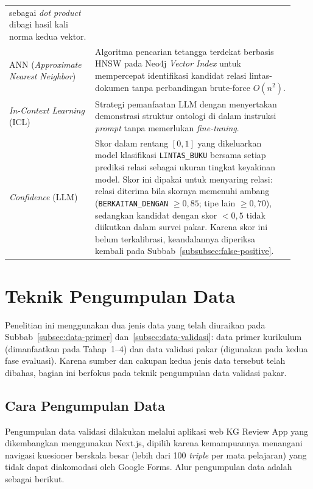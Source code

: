 \documentclass[main]{subfiles}
\begin{document}
\begin{longtable}{@{}p{0.28\linewidth}p{0.65\linewidth}@{}}
      sebagai \textit{dot product} dibagi hasil kali norma kedua vektor.\\
  ANN (\textit{Approximate Nearest Neighbor})
    & Algoritma pencarian tetangga terdekat berbasis HNSW pada Neo4j
      \textit{Vector Index} untuk mempercepat identifikasi kandidat
      relasi lintas-dokumen tanpa perbandingan brute-force
      $O(n^2)$. \\
  \textit{In-Context Learning} (ICL)
    & Strategi pemanfaatan LLM dengan menyertakan demonstrasi struktur
      ontologi di dalam instruksi \textit{prompt} tanpa memerlukan
      \textit{fine-tuning}. \\
  \textit{Confidence} (LLM)
    & Skor dalam rentang $[0,1]$ yang dikeluarkan model klasifikasi
      \texttt{LINTAS\_BUKU} bersama setiap prediksi relasi sebagai ukuran
      tingkat keyakinan model. Skor ini dipakai untuk menyaring relasi:
      relasi diterima bila skornya memenuhi ambang
      (\texttt{BERKAITAN\_DENGAN} $\geq 0{,}85$; tipe lain $\geq 0{,}70$),
      sedangkan kandidat dengan skor $< 0{,}5$ tidak diikutkan dalam
      survei pakar. Karena skor ini belum terkalibrasi, keandalannya
      diperiksa kembali pada Subbab~\ref{subsubsec:false-positive}. \\
\end{longtable}

\section{Teknik Pengumpulan Data}

Penelitian ini menggunakan dua jenis data yang telah diuraikan pada
Subbab~\ref{subsec:data-primer} dan~\ref{subsec:data-validasi}: data primer
kurikulum (dimanfaatkan pada Tahap~1--4) dan data validasi pakar (digunakan
pada kedua fase evaluasi). Karena sumber dan cakupan kedua jenis data tersebut
telah dibahas, bagian ini berfokus pada teknik pengumpulan data validasi pakar.

\subsection{Cara Pengumpulan Data}\label{subsec:cara-pengumpulan}

Pengumpulan data validasi dilakukan melalui aplikasi web KG Review App
yang dikembangkan menggunakan Next.js, dipilih karena kemampuannya
menangani navigasi kuesioner berskala besar (lebih dari 100
\textit{triple} per mata pelajaran) yang tidak dapat diakomodasi oleh
Google Forms. Alur pengumpulan data adalah sebagai berikut.
\end{document}
